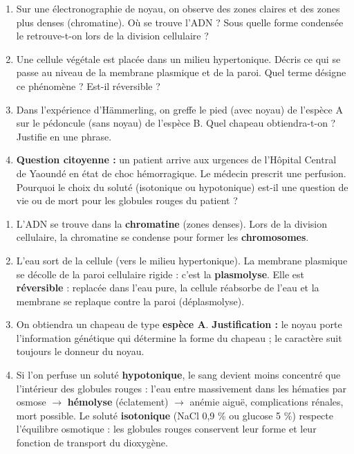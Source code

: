 \documentclass[11pt]{article}
\begin{document}
\begin{exercice}
\begin{enumerate}
    \item Sur une électronographie de noyau, on observe des zones claires et des zones plus denses (chromatine). Où se trouve l'ADN ? Sous quelle forme condensée le retrouve-t-on lors de la division cellulaire ?
    \item Une cellule végétale est placée dans un milieu hypertonique. Décris ce qui se passe au niveau de la membrane plasmique et de la paroi. Quel terme désigne ce phénomène ? Est-il réversible ?
    \item Dans l'expérience d'Hämmerling, on greffe le pied (avec noyau) de l'espèce A sur le pédoncule (sans noyau) de l'espèce B. Quel chapeau obtiendra-t-on ? Justifie en une phrase.
    \item \textbf{Question citoyenne :} un patient arrive aux urgences de l'Hôpital Central de Yaoundé en état de choc hémorragique. Le médecin prescrit une perfusion. Pourquoi le choix du soluté (isotonique ou hypotonique) est-il une question de vie ou de mort pour les globules rouges du patient ?
\end{enumerate}
\end{exercice}

\begin{corrige}
\begin{enumerate}
    \item L'ADN se trouve dans la \textbf{chromatine} (zones denses). Lors de la division cellulaire, la chromatine se condense pour former les \textbf{chromosomes}.
    \item L'eau sort de la cellule (vers le milieu hypertonique). La membrane plasmique se décolle de la paroi cellulaire rigide : c'est la \textbf{plasmolyse}. Elle est \textbf{réversible} : replacée dans l'eau pure, la cellule réabsorbe de l'eau et la membrane se replaque contre la paroi (déplasmolyse).
    \item On obtiendra un chapeau de type \textbf{espèce A}. \textbf{Justification :} le noyau porte l'information génétique qui détermine la forme du chapeau ; le caractère suit toujours le donneur du noyau.
    \item Si l'on perfuse un soluté \textbf{hypotonique}, le sang devient moins concentré que l'intérieur des globules rouges : l'eau entre massivement dans les hématies par osmose $\rightarrow$ \textbf{hémolyse} (éclatement) $\rightarrow$ anémie aiguë, complications rénales, mort possible. Le soluté \textbf{isotonique} (NaCl 0,9 \% ou glucose 5 \%) respecte l'équilibre osmotique : les globules rouges conservent leur forme et leur fonction de transport du dioxygène.
\end{enumerate}
\end{corrige}
\end{document}
